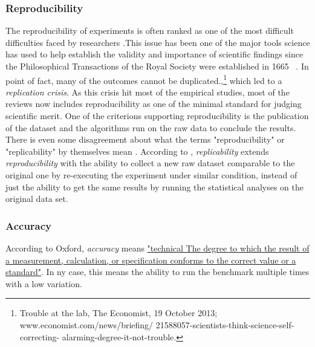 \subsubsection{Reproducibility}
The reproducibility of experiments is often ranked as one of the most difficult difficulties faced by researchers .This issue has been one of the major tools science has used to help establish the validity and importance of scientific findings since the Philosophical Transactions of the Royal Society were established in 1665~\cite{hankins1986debate} . In point of fact, many of the outcomes cannot be duplicated.,\footnote{Trouble at the lab, The Economist, 19 October 2013;  www.economist.com/news/briefing/ 21588057-scientists-think-science-self-correcting- alarming-degree-it-not-trouble.} which led to a \emph{replication crisis}.
As this crisis hit most of the empirical studies, most of the reviews now includes reproducibility as one of the minimal standard for judging scientific merit.\cite{peng2011reproducible}
One of the criterions supporting reproducibility is the publication of the dataset and the algorithms run on the raw data to conclude the results.
There is even some disagreement about what the terms "reproducibility" or "replicability" by themselves mean \cite{goodman2016does}.
According to \cite{echtler2018open}, \emph{replicability} extends \emph{reproducibility} with the ability to collect a new raw dataset comparable to the original one by re-executing the experiment under similar condition, instead of just the ability to get the same results by running the statistical analyses on the original data set.
\subsubsection{Accuracy}
According to Oxford, \emph{accuracy} means \href{https://www.lexico.com/definition/accuracy}{"technical The degree to which the result of a measurement, calculation, or specification conforms to the correct value or a standard"}.
In ny case, this means the ability to run the benchmark multiple times with a low variation.


